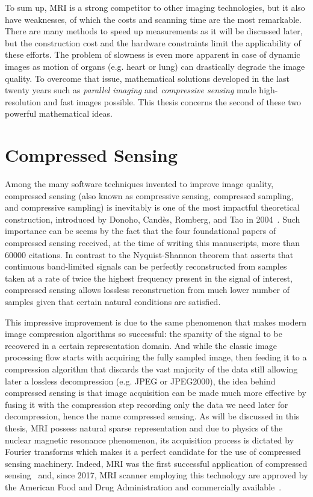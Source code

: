 To sum up, MRI is a strong competitor to other imaging technologies, but it also have weaknesses, of which the costs and scanning time are the most remarkable. There are many methods to speed up measurements as it will be discussed later, but the construction cost and the hardware constraints limit the applicability of these efforts. The problem of slowness is even more apparent in case of dynamic images as motion of organs (e.g. heart or lung) can drastically degrade the image quality. To overcome that issue, mathematical solutions developed in the last twenty years such as \emph{parallel imaging} and \emph{compressive sensing} made high-resolution and fast images possible. This thesis concerns the second of these two powerful mathematical ideas.

\section{Compressed Sensing}

Among the many software techniques invented to improve image quality, compressed sensing (also known as compressive sensing, compressed sampling, and compressive sampling) is inevitably is one of the most impactful theoretical construction, introduced by Donoho, Candès, Romberg, and Tao in 2004~\cite{candes_robust_2006, donoho_compressed_2006, candes_nearoptimal_2006}. Such importance can be seems by the fact that the four foundational papers of compressed sensing received, at the time of writing this manuscripts, more than 60000 citations. In contrast to the Nyquist-Shannon theorem that asserts that continuous band-limited signals can be perfectly reconstructed from samples taken at a rate of twice the highest frequency present in the signal of interest, compressed sensing allows lossless reconstruction from much lower number of samples given that certain natural conditions are satisfied.

This impressive improvement is due to the same phenomenon that makes modern image compression algorithms so successful: the sparsity of the signal to be recovered in a certain representation domain. And while the classic image processing flow starts with acquiring the fully sampled image, then feeding it to a compression algorithm that discards the vast majority of the data still allowing later a lossless decompression (e.g. JPEG or JPEG2000), the idea behind compressed sensing is that image acquisition can be made much more effective by fusing it with the compression step recording only the data we need later for decompression, hence the name compressed sensing. As will be discussed in this thesis, MRI possess natural sparse representation and due to physics of the nuclear magnetic resonance phenomenon, its acquisition process is dictated by Fourier transforms which makes it a perfect candidate for the use of compressed sensing machinery. Indeed, MRI was the first successful application of compressed sensing~\cite{lustig} and, since 2017, MRI scanner employing this technology are approved by the American Food and Drug Administration and commercially available~\cite{fda_siemens, fda_GE}.

